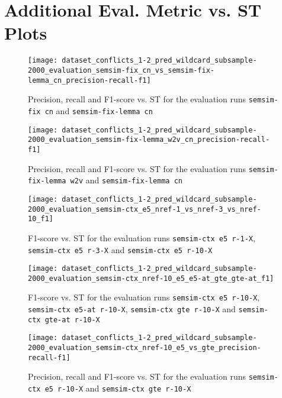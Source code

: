 \newpage
\section{Additional Eval. Metric vs. ST Plots}
\label{app-sec:eval-metric-vs-st-plots}

\begin{figure}[H]
\centering
\texttt{[image: dataset\_conflicts\_1-2\_pred\_wildcard\_subsample-2000\_evaluation\_semsim-fix\_cn\_vs\_semsim-fix-lemma\_cn\_precision-recall-f1]}
\caption{Precision, recall and F1-score vs. ST for the evaluation runs \texttt{semsim-fix cn} and \texttt{semsim-fix-lemma cn}}
\label{fig:prec-rec-f1-semsim-fix-lemma}
\end{figure}

\begin{figure}[H]
\centering
\texttt{[image: dataset\_conflicts\_1-2\_pred\_wildcard\_subsample-2000\_evaluation\_semsim-fix-lemma\_w2v\_cn\_precision-recall-f1]}
\caption{Precision, recall and F1-score vs. ST for the evaluation runs \texttt{semsim-fix-lemma w2v} and \texttt{semsim-fix-lemma cn}}
\label{fig:prec-rec-f1-semxim-fix-lemma-model}
\end{figure}

\begin{figure}[H]
\centering
\texttt{[image: dataset\_conflicts\_1-2\_pred\_wildcard\_subsample-2000\_evaluation\_semsim-ctx\_e5\_nref-1\_vs\_nref-3\_vs\_nref-10\_f1]}
\caption{F1-score vs. ST for the evaluation runs \texttt{semsim-ctx e5 r-1-X}, \texttt{semsim-ctx e5 r-3-X} and \texttt{semsim-ctx e5 r-10-X}}
\label{fig:f1-semsim-ctx-nref}
\end{figure}

\begin{figure}[H]
\centering
\texttt{[image: dataset\_conflicts\_1-2\_pred\_wildcard\_subsample-2000\_evaluation\_semsim-ctx\_nref-10\_e5\_e5-at\_gte\_gte-at\_f1]}
\caption{F1-score vs. ST for the evaluation runs \texttt{semsim-ctx e5 r-10-X}, \texttt{semsim-ctx e5-at r-10-X}, \texttt{semsim-ctx gte r-10-X} and \texttt{semsim-ctx gte-at r-10-X}}
\label{fig:f1-semsim-ctx-model-at}
\end{figure}

\begin{figure}[H]
\centering
\texttt{[image: dataset\_conflicts\_1-2\_pred\_wildcard\_subsample-2000\_evaluation\_semsim-ctx\_nref-10\_e5\_vs\_gte\_precision-recall-f1]}
\caption{Precision, recall and F1-score vs. ST for the evaluation runs \texttt{semsim-ctx e5 r-10-X} and \texttt{semsim-ctx gte r-10-X}}
\label{fig:prec-rec-f1-semsim-ctx-model}
\end{figure}

